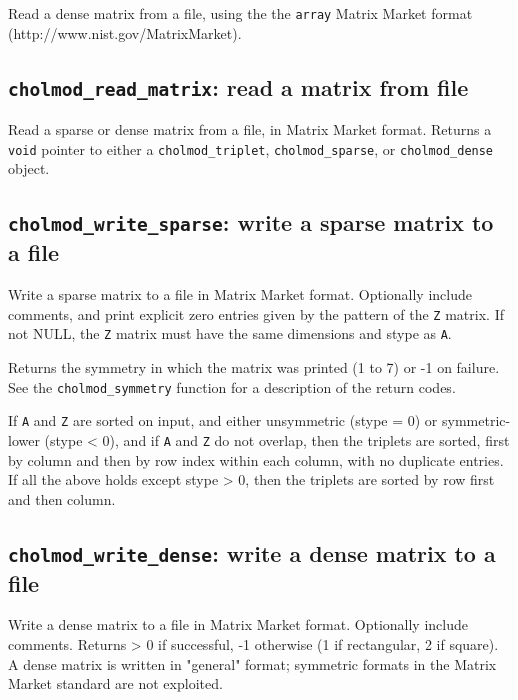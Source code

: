 \documentclass[11pt]{article}
\begin{document}

Read a dense matrix from a file, using the the {\tt array} 
Matrix Market format 
\newline (http://www.nist.gov/MatrixMarket).

\subsection{{\tt cholmod\_read\_matrix}: read a matrix from file}


Read a sparse or dense matrix from a file, in Matrix Market format.
Returns a {\tt void} pointer to either a
{\tt cholmod\_triplet},
{\tt cholmod\_sparse}, or
{\tt cholmod\_dense} object.

\newpage \subsection{{\tt cholmod\_write\_sparse}: write a sparse matrix to a file}


Write a sparse matrix to a file in Matrix Market format.   Optionally include
comments, and print explicit zero entries given by the pattern of the {\tt Z}
matrix.  If not NULL, the {\tt Z} matrix must have the same dimensions and stype
as {\tt A}.

Returns the symmetry in which the matrix was printed
(1 to 7) or -1 on failure.  See the {\tt cholmod\_symmetry} function for
a description of the return codes.

If {\tt A} and {\tt Z} are sorted on input, and either unsymmetric (stype = 0) or
symmetric-lower (stype < 0), and if {\tt A} and {\tt Z} do not overlap,
then the triplets
are sorted, first by column and then by row index within each column, with
no duplicate entries.  If all the above holds except stype > 0, then the
triplets are sorted by row first and then column.

\subsection{{\tt cholmod\_write\_dense}: write a dense matrix to a file}


Write a dense matrix to a file in Matrix Market format.   Optionally include
comments.  Returns > 0 if successful, -1 otherwise (1 if rectangular, 2 if
square).
A dense matrix is written in "general" format; symmetric formats in the
Matrix Market standard are not exploited.
\end{document}
